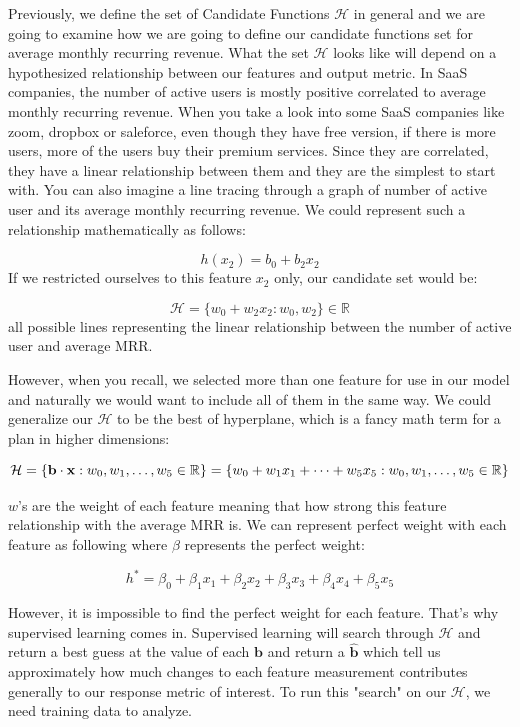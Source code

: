 \documentclass[12pt]{article}
\begin{document}
Previously, we define the set of Candidate Functions $\mathcal{H}$ in general and we are going to examine how we are going to define our candidate functions set for average monthly recurring revenue. What the set $\mathcal{H}$ looks like will depend on a hypothesized relationship between our features and output metric. In SaaS companies, the number of active users is mostly positive correlated to average monthly recurring revenue. When you take a look into some SaaS companies like zoom, dropbox or saleforce, even though they have free version, if there is more users, more of the users buy their premium services. Since they are correlated, they have a linear relationship between them and they are the simplest to start with. You can also imagine a line tracing through a graph of number of active user and its average monthly recurring revenue. We could represent such a relationship mathematically as follows:

\[
h(x_2) = b_0 + b_2x_2
\]
If we restricted ourselves to this feature $x_2$ only, our candidate set would be:

\[
\mathcal{H} = \{w_0 + w_2x_2: w_0,w_2\} \in \mathbb{R}
\]
all possible lines representing the linear relationship between the number of active user and average MRR. 

However, when you recall, we selected more than one feature for use in our model and naturally we would want to include all of them in the same way. We could generalize our $\mathcal{H}$ to be the best of hyperplane, which is a fancy math term for a plan in higher dimensions:

\[
\mathcal{H} = \{\mathbf{b} \cdot \mathbf{x}: w_0, w_1, \dots, w_5 \space \in \mathbb{R}\} = \{w_0 + w_1x_1 + \dots + w_5x_5:w_0, w_1, \dots, w_5 \space \in \mathbb{R} \}
\]

$w$'s are the weight of each feature meaning that how strong this feature relationship with the average MRR is. We can represent perfect weight with each feature as following where $\beta$ represents the perfect weight:

\[
h^*  = \beta_0 + \beta_1x_1+ \beta_2x_2 + \beta_3x_3 + \beta_4x_4 + \beta_5x_5
\]


However, it is impossible to find the perfect weight for each feature. That's why supervised learning comes in. Supervised learning will search through $\mathcal{H}$ and return a best guess at the value of each $\mathbf{b}$ and return a $\hat{\mathbf{b}}$ which tell us approximately how much changes to each feature measurement contributes generally to our response metric of interest. To run this "search" on our $\mathcal{H}$, we need training data to analyze.
\end{document}
